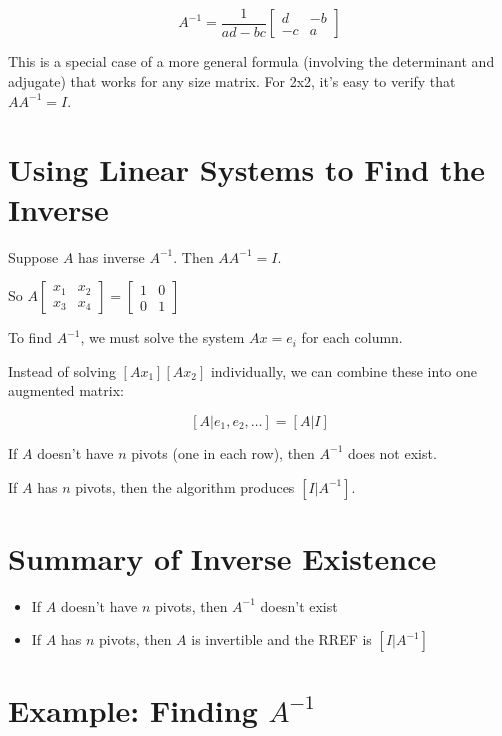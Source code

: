 \documentclass[12pt,a4paper]{article}
\begin{document}
\[ A^{-1} = \frac{1}{ad-bc} \begin{bmatrix} d & -b \\ -c & a \end{bmatrix} \]

This is a special case of a more general formula (involving the determinant and adjugate) that works for any size matrix. For 2x2, it's easy to verify that $AA^{-1} = I$.

\section{Using Linear Systems to Find the Inverse}

Suppose $A$ has inverse $A^{-1}$. Then $AA^{-1} = I$.

So $A \begin{bmatrix} x_1 & x_2 \\ x_3 & x_4 \end{bmatrix} = \begin{bmatrix} 1 & 0 \\ 0 & 1 \end{bmatrix}$

To find $A^{-1}$, we must solve the system $Ax = e_i$ for each column.

Instead of solving $[Ax_1] [Ax_2]$ individually, we can combine these into one augmented matrix:

\[ [A|e_1, e_2, \ldots] = [A|I] \]

If $A$ doesn't have $n$ pivots (one in each row), then $A^{-1}$ does not exist.

If $A$ has $n$ pivots, then the algorithm produces $[I|A^{-1}]$.

\section{Summary of Inverse Existence}

\begin{itemize}
    \item If $A$ doesn't have $n$ pivots, then $A^{-1}$ doesn't exist
    \item If $A$ has $n$ pivots, then $A$ is invertible and the RREF is $[I|A^{-1}]$
\end{itemize}

\section{Example: Finding $A^{-1}$}
\end{document}
